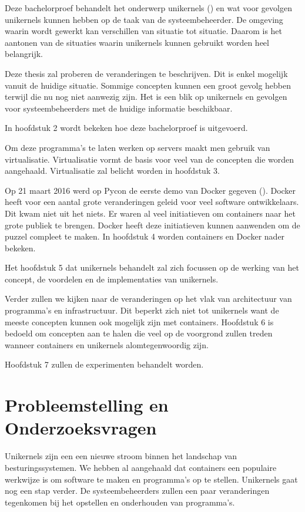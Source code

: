 \documentclass[pdftex,a4paper,12pt,twoside]{report}
\begin{document}
Deze bachelorproef behandelt het onderwerp unikernels (\cite{Madhavapeddy2013}) en wat voor gevolgen unikernels kunnen hebben op de taak van de systeembeheerder. De omgeving waarin wordt gewerkt kan verschillen van situatie tot situatie. Daarom is het aantonen van de situaties waarin unikernels kunnen gebruikt worden heel belangrijk.

Deze thesis zal proberen de veranderingen te beschrijven. Dit is enkel mogelijk vanuit de huidige situatie. Sommige concepten kunnen een groot gevolg hebben terwijl die nu nog niet aanwezig zijn. Het is een blik op unikernels en gevolgen voor systeembeheerders met de huidige informatie beschikbaar.

In hoofdstuk 2 wordt bekeken hoe deze bachelorproef is uitgevoerd.

Om deze programma's te laten werken op servers maakt men gebruik van virtualisatie. Virtualisatie vormt de basis voor veel van de concepten die worden aangehaald. Virtualisatie zal belicht worden in hoofdstuk 3.

Op 21 maart 2016 werd op Pycon de eerste demo van Docker gegeven (\cite{Hykes2013}). Docker heeft voor een aantal grote veranderingen geleid voor veel software ontwikkelaars. Dit kwam niet uit het niets. Er waren al veel initiatieven om containers naar het grote publiek te brengen. Docker heeft deze initiatieven kunnen aanwenden om de puzzel compleet te maken. In hoofdstuk 4 worden containers en Docker nader bekeken.

Het hoofdstuk 5 dat unikernels behandelt zal zich focussen op de werking van het concept, de voordelen en de implementaties van unikernels. 

Verder zullen we kijken naar de veranderingen op het vlak van architectuur van programma's en infrastructuur. Dit beperkt zich niet tot unikernels want de meeste concepten kunnen ook mogelijk zijn met containers. Hoofdstuk 6 is bedoeld om concepten aan te halen die veel op de voorgrond zullen treden wanneer containers en unikernels alomtegenwoordig zijn.

Hoofdstuk 7 zullen de experimenten behandelt worden.

\section{Probleemstelling en Onderzoeksvragen}
\label{sec:onderzoeksvragen}

Unikernels zijn een een nieuwe stroom binnen het landschap van besturingssystemen. We hebben al aangehaald dat containers een populaire werkwijze is om software te maken en programma's op te stellen. Unikernels gaat nog een stap verder. De systeembeheerders zullen een paar veranderingen tegenkomen bij het opstellen en onderhouden van programma's. 
\end{document}
